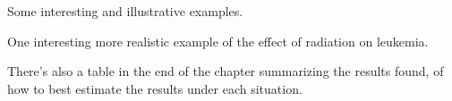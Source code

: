 Some interesting and illustrative examples.

One interesting more realistic example of the effect of radiation on leukemia.

There's also a table in the end of the chapter summarizing the results found, of how to best estimate the results under each situation.
